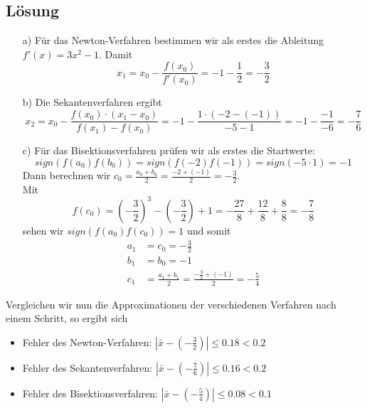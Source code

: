 \subsection*{Lösung}
\begin{itemize}
\item[a)] Für das Newton-Verfahren bestimmen wir als erstes die Ableitung $f'(x)=3x^2-1$. Damit
$$
x_1=x_0-\frac{f(x_0)}{f'(x_0)}=-1-\frac{1}{2}=-\frac{3}{2}
$$
\item[b)] Die Sekantenverfahren ergibt
$$
x_2=x_0-\frac{f(x_0)\cdot (x_1-x_0)}{f(x_1)-f(x_0)}=-1-\frac{1\cdot (-2-(-1))}{-5-1}=-1-\frac{-1}{-6}=-\frac{7}{6}
$$
\item[c)] Für das Bisektionsverfahren prüfen wir als erstes die Startwerte:
$$
sign(f(a_0)f(b_0))=sign(f(-2)f(-1))=sign(-5 \cdot 1)=-1
$$
Dann berechnen wir $c_0=\frac{a_0+b_0}{2}=\frac{-2+(-1)}{2}=-\frac{3}{2}$.\\
Mit
$$
f(c_0)=\left(-\frac{3}{2}\right)^3-(-\frac{3}{2})+1=-\frac{27}{8}+\frac{12}{8}+\frac{8}{8}=-\frac{7}{8}
$$
sehen wir $sign(f(a_0)f(c_0))=1$ und somit
\begin{align*}
a_1&=c_0=-\frac{3}{2}\\
b_1&=b_0=-1\\
c_1&=\frac{a_1+b_1}{2}=\frac{-\frac{3}{2}+(-1)}{2}=-\frac{5}{4}
\end{align*}
\end{itemize}
Vergleichen wir nun die Approximationen der verschiedenen Verfahren nach einem Schritt, so ergibt sich
\begin{itemize}
\item Fehler des Newton-Verfahren: $|\bar x - (-\frac{3}{2})|\le 0.18 < 0.2$
\item Fehler des Sekantenverfahren: $|\bar x - (-\frac{7}{6})| \le 0.16 < 0.2$
\item Fehler des Bisektionsverfahren: $|\bar x - (-\frac{5}{4})| \le 0.08 < 0.1$
\end{itemize}
%
